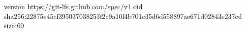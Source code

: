 version https://git-lfs.github.com/spec/v1
oid sha256:22875e45cf395037038253f2c9a10f4b701c35d6d558897ae671d02843e237cd
size 60
